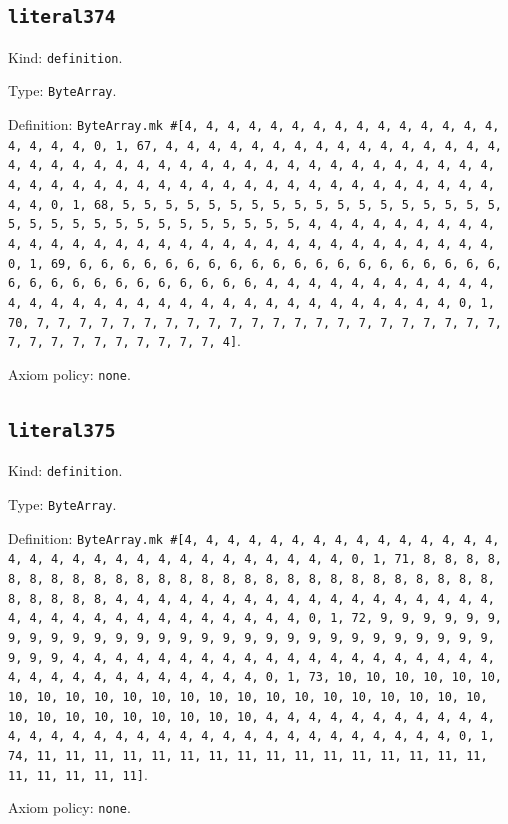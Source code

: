 \documentclass[11pt]{article}
\begin{document}
\subsection*{\texttt{literal374}}
\noindent Kind: \texttt{definition}.\par
\noindent Type: \texttt{ByteArray}.\par
\noindent Definition: \texttt{ByteArray.mk \#[4, 4, 4, 4, 4, 4, 4, 4, 4, 4, 4, 4, 4, 4, 4, 4, 4, 4, 4, 0, 1, 67, 4, 4, 4, 4, 4, 4, 4, 4, 4, 4, 4, 4, 4, 4, 4, 4, 4, 4, 4, 4, 4, 4, 4, 4, 4, 4, 4, 4, 4, 4, 4, 4, 4, 4, 4, 4, 4, 4, 4, 4, 4, 4, 4, 4, 4, 4, 4, 4, 4, 4, 4, 4, 4, 4, 4, 4, 4, 4, 4, 4, 4, 4, 4, 4, 0, 1, 68, 5, 5, 5, 5, 5, 5, 5, 5, 5, 5, 5, 5, 5, 5, 5, 5, 5, 5, 5, 5, 5, 5, 5, 5, 5, 5, 5, 5, 5, 5, 5, 5, 4, 4, 4, 4, 4, 4, 4, 4, 4, 4, 4, 4, 4, 4, 4, 4, 4, 4, 4, 4, 4, 4, 4, 4, 4, 4, 4, 4, 4, 4, 4, 4, 0, 1, 69, 6, 6, 6, 6, 6, 6, 6, 6, 6, 6, 6, 6, 6, 6, 6, 6, 6, 6, 6, 6, 6, 6, 6, 6, 6, 6, 6, 6, 6, 6, 6, 6, 4, 4, 4, 4, 4, 4, 4, 4, 4, 4, 4, 4, 4, 4, 4, 4, 4, 4, 4, 4, 4, 4, 4, 4, 4, 4, 4, 4, 4, 4, 4, 4, 0, 1, 70, 7, 7, 7, 7, 7, 7, 7, 7, 7, 7, 7, 7, 7, 7, 7, 7, 7, 7, 7, 7, 7, 7, 7, 7, 7, 7, 7, 7, 7, 7, 7, 7, 4]}.\par
\noindent Axiom policy: \texttt{none}.\par
\subsection*{\texttt{literal375}}
\noindent Kind: \texttt{definition}.\par
\noindent Type: \texttt{ByteArray}.\par
\noindent Definition: \texttt{ByteArray.mk \#[4, 4, 4, 4, 4, 4, 4, 4, 4, 4, 4, 4, 4, 4, 4, 4, 4, 4, 4, 4, 4, 4, 4, 4, 4, 4, 4, 4, 4, 4, 4, 0, 1, 71, 8, 8, 8, 8, 8, 8, 8, 8, 8, 8, 8, 8, 8, 8, 8, 8, 8, 8, 8, 8, 8, 8, 8, 8, 8, 8, 8, 8, 8, 8, 8, 8, 4, 4, 4, 4, 4, 4, 4, 4, 4, 4, 4, 4, 4, 4, 4, 4, 4, 4, 4, 4, 4, 4, 4, 4, 4, 4, 4, 4, 4, 4, 4, 4, 0, 1, 72, 9, 9, 9, 9, 9, 9, 9, 9, 9, 9, 9, 9, 9, 9, 9, 9, 9, 9, 9, 9, 9, 9, 9, 9, 9, 9, 9, 9, 9, 9, 9, 9, 4, 4, 4, 4, 4, 4, 4, 4, 4, 4, 4, 4, 4, 4, 4, 4, 4, 4, 4, 4, 4, 4, 4, 4, 4, 4, 4, 4, 4, 4, 4, 4, 0, 1, 73, 10, 10, 10, 10, 10, 10, 10, 10, 10, 10, 10, 10, 10, 10, 10, 10, 10, 10, 10, 10, 10, 10, 10, 10, 10, 10, 10, 10, 10, 10, 10, 10, 4, 4, 4, 4, 4, 4, 4, 4, 4, 4, 4, 4, 4, 4, 4, 4, 4, 4, 4, 4, 4, 4, 4, 4, 4, 4, 4, 4, 4, 4, 4, 4, 0, 1, 74, 11, 11, 11, 11, 11, 11, 11, 11, 11, 11, 11, 11, 11, 11, 11, 11, 11, 11, 11, 11, 11]}.\par
\noindent Axiom policy: \texttt{none}.\par
\end{document}
